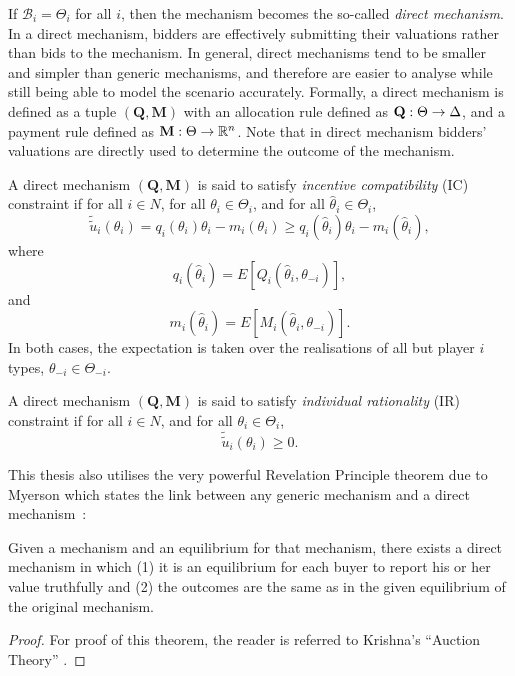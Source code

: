 If $\mathcal{B}_i = \Theta_i$ for all $i$, then the mechanism becomes the so-called \emph{direct mechanism}. In a direct mechanism, bidders are effectively submitting their valuations rather than bids to the mechanism. In general, direct mechanisms tend to be smaller and simpler than generic mechanisms, and therefore are easier to analyse while still being able to model the scenario accurately. Formally, a direct mechanism is defined as a tuple $(\mathbf{Q},\mathbf{M})$ with an allocation rule defined as $\mathbf{Q}:\nobreak\Theta\to\Delta$, and a payment rule defined as $\mathbf{M}:\nobreak\Theta\to\mathbb{R}^n$. Note that in direct mechanism bidders' valuations are directly used to determine the outcome of the mechanism.

A direct mechanism $(\mathbf{Q},\mathbf{M})$ is said to satisfy \emph{incentive compatibility} (IC) constraint if for all $i\in N$, for all $\theta_i\in\Theta_i$, and for all $\hat{\theta}_i\in\Theta_i$,
\begin{equation}
  \tilde{\tilde{u}}_i(\theta_i) = q_i(\theta_i)\theta_i - m_i(\theta_i)\ge q_i(\hat{\theta}_i)\theta_i - m_i(\hat{\theta}_i),
\end{equation}
where
\begin{equation}
  q_i(\hat{\theta}_i) = E[Q_i(\hat{\theta}_i,\theta_{-i})],
\end{equation}
and
\begin{equation}
  m_i(\hat{\theta}_i) = E[M_i(\hat{\theta}_i, \theta_{-i})].
\end{equation}
In both cases, the expectation is taken over the realisations of all but player $i$ types, $\theta_{-i}\in\Theta_{-i}$.

A direct mechanism $(\mathbf{Q}, \mathbf{M})$ is said to satisfy \emph{individual rationality} (IR) constraint if for all $i\in N$, and for all $\theta_i\in\Theta_i$,
\begin{equation}
  \tilde{\tilde{u}}_i(\theta_i)\ge 0.
\end{equation}

This thesis also utilises the very powerful Revelation Principle theorem due to Myerson which states the link between any generic mechanism and a direct mechanism~\cite{Myerson1979, Krishna10}:
\begin{thm}
\label{thm:revelation_principle_notation}
Given a mechanism and an equilibrium for that mechanism, there exists a direct mechanism in which (1) it is an equilibrium for each buyer to report his or her value truthfully and (2) the outcomes are the same as in the given equilibrium of the original mechanism.
\end{thm}
\begin{proof}
For proof of this theorem, the reader is referred to Krishna's ``Auction Theory'' \cite{Krishna10}.
\end{proof}

